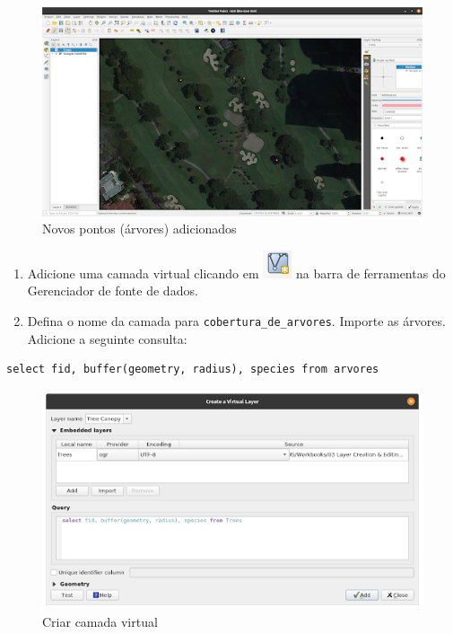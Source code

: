 \documentclass[
]{book}
\providecommand{\tightlist}{%
  \setlength{\itemsep}{0pt}\setlength{\parskip}{0pt}}
\begin{document}
\begin{figure}
\centering
\includegraphics{media/modulo2/virtual-4.png}
\caption{Novos pontos (árvores) adicionados}
\end{figure}

\begin{enumerate}
\def\labelenumi{\arabic{enumi}.}
\setcounter{enumi}{8}
\tightlist
\item
  Adicione uma camada virtual clicando em \includegraphics{media/modulo2/symbol-virtual.png}
  na barra de ferramentas do Gerenciador de fonte de dados.
\item
  Defina o nome da camada para \texttt{cobertura\_de\_arvores}. Importe as árvores. Adicione a seguinte consulta:
\end{enumerate}

\begin{verbatim}
select fid, buffer(geometry, radius), species from arvores
\end{verbatim}

\begin{figure}
\centering
\includegraphics{media/modulo2/virtual-5.png}
\caption{Criar camada virtual}
\end{figure}
\end{document}
